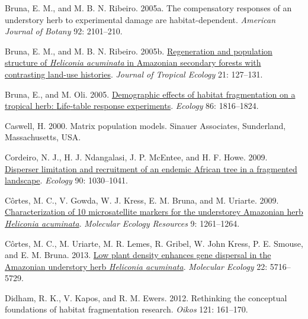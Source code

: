 \documentclass[
  12pt,
  man, donotrepeattitle,floatsintext]{apa6}
\newlength{\cslhangindent}
\newlength{\cslentryspacingunit} %
\newenvironment{CSLReferences}[2] %
 {%
  \setlength{\parindent}{0pt}
  \ifodd #1
  \let\oldpar\par
  \def\par{\hangindent=\cslhangindent\oldpar}
  \fi
  \setlength{\parskip}{#2\cslentryspacingunit}
 }%
 {}
\begin{document}
\begin{CSLReferences}{1}{0}
\leavevmode{}%
Bruna, E. M., and M. B. N. Ribeiro. 2005a. The compensatory responses of an understory herb to experimental damage are habitat-dependent. \emph{American Journal of Botany} 92: 2101--210.

\leavevmode{}%
Bruna, E. M., and M. B. N. Ribeiro. 2005b. \href{https://doi.org/10.1017/S0266467404002007}{Regeneration and population structure of \emph{{Heliconia} acuminata} in {Amazonian} secondary forests with contrasting land-use histories}. \emph{Journal of Tropical Ecology} 21: 127--131.

\leavevmode{}%
Bruna, E., and M. Oli. 2005. \href{https://doi.org/10.1890/04-1716}{Demographic effects of habitat fragmentation on a tropical herb: {Life}-table response experiments}. \emph{Ecology} 86: 1816--1824.

\leavevmode{}%
Caswell, H. 2000. Matrix population models. Sinauer Associates, Sunderland, Massachusetts, USA.

\leavevmode{}%
Cordeiro, N. J., H. J. Ndangalasi, J. P. McEntee, and H. F. Howe. 2009. \href{https://doi.org/10.1890/07-1208.1}{Disperser limitation and recruitment of an endemic {African} tree in a fragmented landscape}. \emph{Ecology} 90: 1030--1041.

\leavevmode{}%
Côrtes, M. C., V. Gowda, W. J. Kress, E. M. Bruna, and M. Uriarte. 2009. \href{https://doi.org/10.1111/j.1755-0998.2009.02627.x}{Characterization of 10 microsatellite markers for the understorey {Amazonian} herb \emph{{Heliconia} acuminata}}. \emph{Molecular Ecology Resources} 9: 1261--1264.

\leavevmode{}%
Côrtes, M. C., M. Uriarte, M. R. Lemes, R. Gribel, W. John Kress, P. E. Smouse, and E. M. Bruna. 2013. \href{https://doi.org/10.1111/mec.12495}{Low plant density enhances gene dispersal in the {Amazonian} understory herb \emph{{Heliconia} acuminata}}. \emph{Molecular Ecology} 22: 5716--5729.

\leavevmode{}%
Didham, R. K., V. Kapos, and R. M. Ewers. 2012. Rethinking the conceptual foundations of habitat fragmentation research. \emph{Oikos} 121: 161--170.


\end{CSLReferences}
\end{document}
